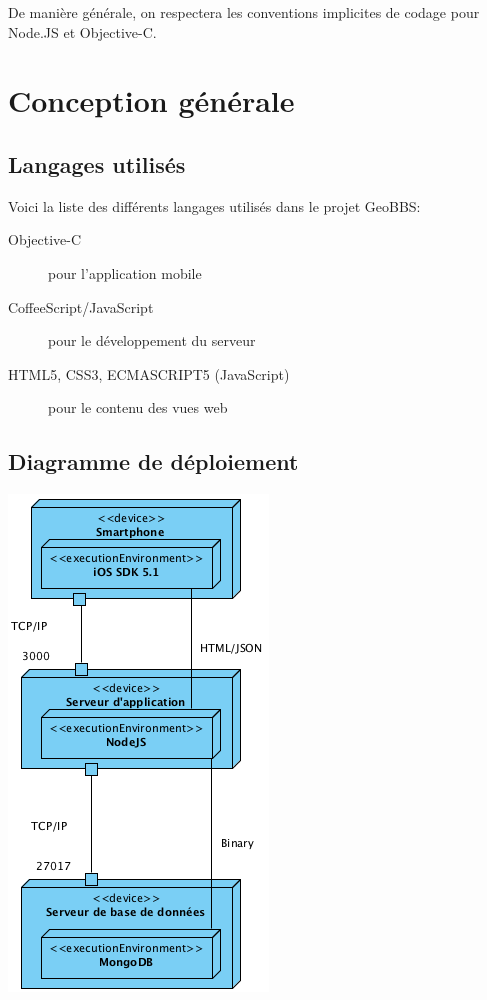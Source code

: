 \documentclass[a4paper,12pt]{report}
\begin{document}
\begin{onehalfspace}
De manière générale, on respectera les conventions implicites de codage pour Node.JS et Objective-C.

\chapter{Conception générale}
\section{Langages utilisés} %
\label{sub:langages_utilis_s}

Voici la liste des différents langages utilisés dans le projet GeoBBS:

\begin{description}
  \item[Objective-C] pour l'application mobile
  \item[CoffeeScript/JavaScript] pour le développement du serveur
  \item[HTML5, CSS3, ECMASCRIPT5 (JavaScript)] pour le contenu des vues web
\end{description}

\section{Diagramme de déploiement} %
\label{sec:diagramme_de_d_ploiement}

\begin{center}
	\includegraphics{diag_deploiement.png}
\end{center}


\end{onehalfspace}
\end{document}
